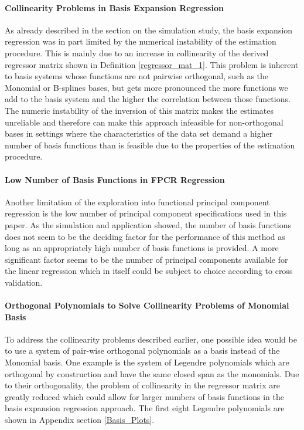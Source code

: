 \documentclass[11pt,twoside,a4paper]{article}
\begin{document}
	\paragraph{Collinearity Problems in Basis Expansion Regression}
	As already described in the section on the simulation study, the basis expansion regression was in part limited by the numerical instability of the estimation procedure. This is mainly due to an increase in collinearity of the derived regressor matrix shown in Definition \ref{regressor_mat_1}. This problem is inherent to basis systems whose functions are not pairwise orthogonal, such as the Monomial or B-splines bases, but gets more pronounced the more functions we add to the basis system and the higher the correlation between those functions. \\
	The numeric instability of the inversion of this matrix makes the estimates unreliable and therefore can make this approach infeasible for non-orthogonal bases in settings where the characteristics of the data set demand a higher number of basis functions than is feasible due to the properties of the estimation procedure.
	\vspace{-0.2cm}
	
	\paragraph{Low Number of Basis Functions in FPCR Regression}
	Another limitation of the exploration into functional principal component regression is the low number of principal component specifications used in this paper. As the simulation and application showed, the number of basis functions does not seem to be the deciding factor for the performance of this method as long as an appropriately high number of basis functions is provided. 
	A more significant factor seems to be the number of principal components available for the linear regression which in itself could be subject to choice according to cross validation.
	\vspace{-0.2cm}
	
	
	\paragraph{Orthogonal Polynomials to Solve Collinearity Problems of Monomial Basis}
	To address the collinearity problems described earlier, one possible idea would be to use a system of pair-wise orthogonal polynomials as a basis instead of the Monomial basis. One example is the system of Legendre polynomials which are orthogonal by construction and have the same closed span as the monomials. Due to their orthogonality, the problem of collinearity in the regressor matrix are greatly reduced which could allow for larger numbers of basis functions in the basis expansion regression approach. The first eight Legendre polynomials are shown in Appendix section \ref{Basis_Plots}.
	\vspace{-0.2cm}
	
\end{document}
